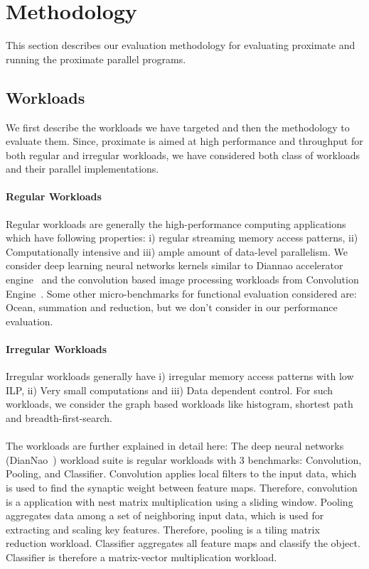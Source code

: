 \section{Methodology} \label{sec:meth}

This section describes our evaluation methodology for evaluating proximate and running the
proximate parallel programs.

\subsection{Workloads}
We first describe the workloads we have targeted and then the methodology to 
evaluate them. Since, proximate is aimed at high performance and throughput
for both regular and irregular workloads, we have considered both class of workloads
and their parallel implementations. 

\paragraph{Regular Workloads}
Regular workloads are generally the high-performance computing applications
which have following properties: i) regular streaming memory access patterns,
ii) Computationally intensive and iii) ample amount of data-level parallelism.
We consider deep learning neural networks kernels similar to Diannao accelerator engine~\cite{diannao}
and the convolution based image processing workloads from Convolution Engine~\cite{convolution_engine}.
Some other micro-benchmarks for functional evaluation considered are: Ocean, summation and reduction, 
but we don't consider in our performance evaluation. 


\paragraph{Irregular Workloads}
Irregular workloads generally have i) irregular memory access patterns
with low ILP, ii) Very small computations and iii) Data dependent control. 
For such workloads, we consider the graph based workloads like histogram, 
shortest path and breadth-first-search. 

\paragraph{}The workloads are further explained in detail here:
The deep neural networks (DianNao~\cite{diannao}) workload suite is regular workloads with 3 benchmarks: Convolution, Pooling, and Classifier. 
Convolution applies local filters to the input data, which is used to find the synaptic weight between feature maps. 
Therefore, convolution is a application with nest matrix multiplication using a sliding window. 
Pooling aggregates data among a set of neighboring input data, which is used for 
extracting and scaling key features. Therefore, pooling is a
tiling matrix reduction workload. 
Classifier aggregates all feature maps and classify the object. Classifier is therefore a matrix-vector multiplication workload. 

